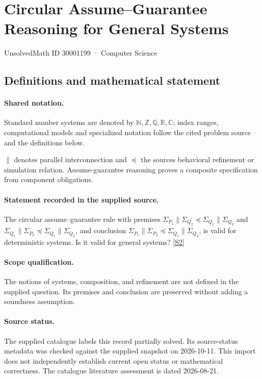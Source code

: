 \documentclass[11pt]{article}
\newcommand{\sref}[2]{\hyperlink{source:#1:#2}{[S#2]}}
\begin{document}
\setcounter{section}{30001198}
\section{Circular Assume–Guarantee Reasoning for General Systems}\label{30001199}
{\small\sffamily UnsolvedMath ID 30001199 · Computer Science}
\subsection{Definitions and mathematical statement}

\paragraph{Shared notation.}Standard number systems are denoted by $\mathbb N,\mathbb Z,\mathbb Q,\mathbb R,\mathbb C$; index ranges, computational models and specialized notation follow the cited problem source and the definitions below.


$\parallel$ denotes parallel interconnection and $\preccurlyeq$ the source\textquotesingle s behavioral refinement or simulation relation. Assume-guarantee reasoning proves a composite specification from component obligations.
\paragraph{Statement recorded in the supplied source.}
The circular assume–guarantee rule with premises $\Sigma_{P_1}\parallel\Sigma_{Q_2}\preccurlyeq\Sigma_{Q_1}\parallel\Sigma_{Q_2}$ and $\Sigma_{Q_1}\parallel\Sigma_{P_2}\preccurlyeq\Sigma_{Q_1}\parallel\Sigma_{Q_2}$, and conclusion $\Sigma_{P_1}\parallel\Sigma_{P_2}\preccurlyeq\Sigma_{Q_1}\parallel\Sigma_{Q_2}$, is valid for deterministic systems. Is it valid for general systems? \sref{30001199}{2}
\paragraph{Scope qualification.}
The notions of systems, composition, and refinement are not defined in the supplied question. Its premises and conclusion are preserved without adding a soundness assumption.
\paragraph{Source status.}
The supplied catalogue labels this record partially solved. Its source-status metadata was checked against the supplied snapshot on 2026-10-11. This import does not independently establish current open status or mathematical correctness. The catalogue literature assessment is dated 2026-08-21.
\end{document}
